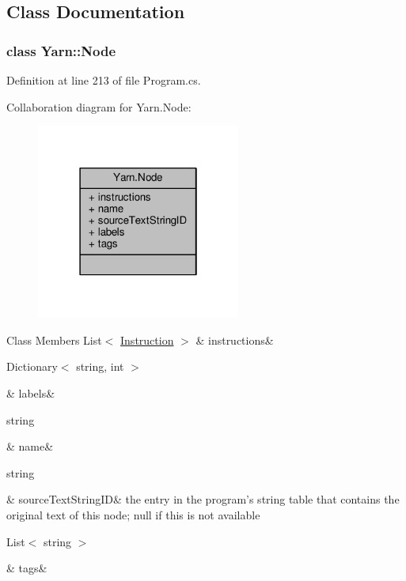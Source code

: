 \subsection{Class Documentation}
\label{a00354}
\hypertarget{a00050_a00354}{}
\subsubsection{class Yarn\-:\-:Node}


Definition at line 213 of file Program.\-cs.



Collaboration diagram for Yarn.\-Node\-:
\nopagebreak
\begin{figure}[H]
\begin{center}
\leavevmode
\includegraphics[width=190pt]{a00367}
\end{center}
\end{figure}
\begin{DoxyFields}{Class Members}
\hypertarget{a00050_a156723a9252b62d288ddf611939ea7c3}{List$<$ \hyperlink{a00115}{Instruction} $>$}\label{a00050_a156723a9252b62d288ddf611939ea7c3}
&
instructions&
\\
\hline

\hypertarget{a00050_a9afa49f4fbc72e806a0210cb4198f12e}{Dictionary$<$ string, int $>$}\label{a00050_a9afa49f4fbc72e806a0210cb4198f12e}
&
labels&
\\
\hline

\hypertarget{a00050_a107b0de3fcfc65e99913edc01b5ce9db}{string}\label{a00050_a107b0de3fcfc65e99913edc01b5ce9db}
&
name&
\\
\hline

\hypertarget{a00050_a09c6af5b50925d0876283b84281b3ed4}{string}\label{a00050_a09c6af5b50925d0876283b84281b3ed4}
&
source\-Text\-String\-I\-D&
the entry in the program's string table that contains the original text of this node; null if this is not available \\
\hline

\hypertarget{a00050_a811086feceebbe79a74eba071c1d516b}{List$<$ string $>$}\label{a00050_a811086feceebbe79a74eba071c1d516b}
&
tags&
\\
\hline

\end{DoxyFields}
